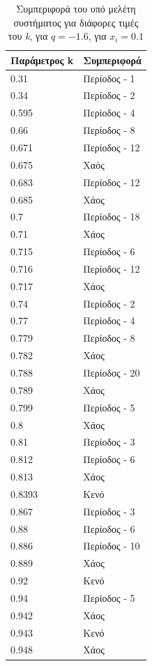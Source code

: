 \begin{table}[ht]
	\centering
	\caption{ Συμπεριφορά του υπό μελέτη συστήματος για διάφορες τιμές του \emph{k}, για $q=-1.6$, για \(x_i=0.1\)}
	\label{tab:abc7}
	\begin{tabular}{l | l }
		Παράμετρος k & Συμπεριφορά \\
		\hline
		0.31 &  Περίοδος -  1 \\
		0.34 &  Περίοδος -  2 \\
		0.595& Περίοδος -  4 \\
		0.66& Περίοδος -  8 \\
		0.671 &  Περίοδος -  12\\
		0.675& Χαός \\
		0.683& Περίοδος -  12 \\
		0.685& Χάος \\
		0.7 &  Περίοδος -  18\\
		0.71&  Χάος \\
		0.715 &  Περίοδος -  6\\
		0.716 &  Περίοδος -  12\\
		0.717 &  Χάος \\
		0.74 & Περίοδος -  2\\
		0.77 &  Περίοδος -  4 \\
		0.779 &  Περίοδος -  8\\
		0.782 & Χάος\\
		0.788 & Περίοδος -  20\\
		0.789 & Χάος\\
		0.799 & Περίοδος -  5\\
		0.8 &Χάος\\
		0.81 & Περίοδος -  3\\
		0.812 & Περίοδος -  6\\
		0.813 & Χάος\\
		0.8393 & Κενό\\
		0.867 & Περίοδος -  3\\
		0.88 & Περίοδος -  6\\
		0.886 & Περίοδος -  10\\
		0.889 & Χάος\\
		0.92 & Κενό\\
		0.94 & Περίοδος -  5\\
		0.942 & Χάος\\
		0.943 & Κενό\\
		0.948 & Χάος\\
	\end{tabular}
\end{table}

